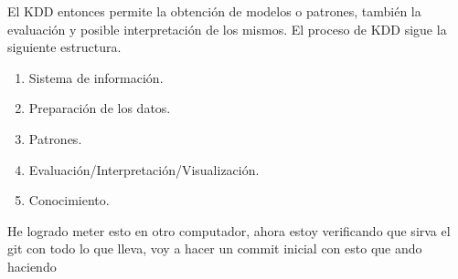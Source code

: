\documentclass{article}
\begin{document}
El KDD entonces permite la obtención de modelos o patrones, también la evaluación y posible interpretación de los mismos. El proceso de KDD sigue la siguiente estructura.

\begin{enumerate}
  \item Sistema de información.
  \item Preparación de los datos.
  \item Patrones.
  \item Evaluación/Interpretación/Visualización.
  \item Conocimiento.
\end{enumerate}


He logrado meter esto en otro computador, ahora estoy verificando que sirva el git con todo lo que lleva, voy a hacer un commit inicial con esto que ando haciendo
\end{document}
